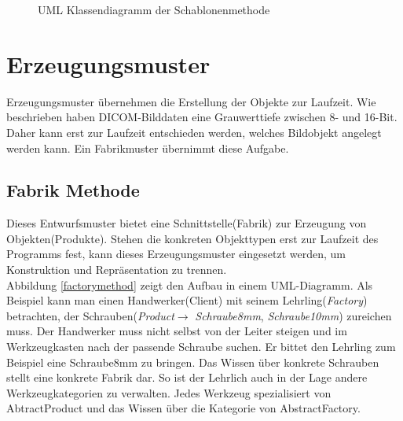 \begin{figure}[htbp]
  \vspace{0.5cm}
  \centering
   \caption{UML Klassendiagramm der Schablonenmethode}
  \label{templatemethod}
  \vspace{0.5cm}
\end{figure}

\section{Erzeugungsmuster} \label{creation}
Erzeugungsmuster übernehmen die Erstellung der Objekte zur Laufzeit. Wie beschrieben haben DICOM-Bilddaten eine Grauwerttiefe zwischen 8- und 16-Bit. Daher kann erst zur Laufzeit entschieden werden, welches Bildobjekt angelegt werden kann. Ein Fabrikmuster übernimmt diese Aufgabe.


\subsection{Fabrik Methode} \label{fabrikmethod}

Dieses Entwurfsmuster bietet eine Schnittstelle(Fabrik) zur Erzeugung von Objekten(Produkte). Stehen die konkreten Objekttypen erst zur Laufzeit des Programms fest, kann dieses Erzeugungsmuster eingesetzt werden, um Konstruktion und Repräsentation zu trennen\cite[3.3]{starke:swa}.\\
Abbildung \ref{factorymethod} zeigt den Aufbau in einem UML-Diagramm. Als Beispiel kann man einen Handwerker(Client) mit seinem Lehrling(\textit{Factory}) betrachten, der Schrauben(\textit{Product}$\rightarrow$ \textit{Schraube8mm}, \textit{Schraube10mm}) zureichen muss. Der Handwerker muss nicht selbst von der Leiter steigen und im Werkzeugkasten nach der passende Schraube suchen. Er bittet den Lehrling zum Beispiel eine Schraube8mm zu bringen.
Das Wissen über konkrete Schrauben stellt eine konkrete Fabrik dar. So ist der Lehrlich auch in der Lage andere Werkzeugkategorien zu verwalten. Jedes Werkzeug spezialisiert von AbtractProduct und das Wissen über die Kategorie von AbstractFactory.

